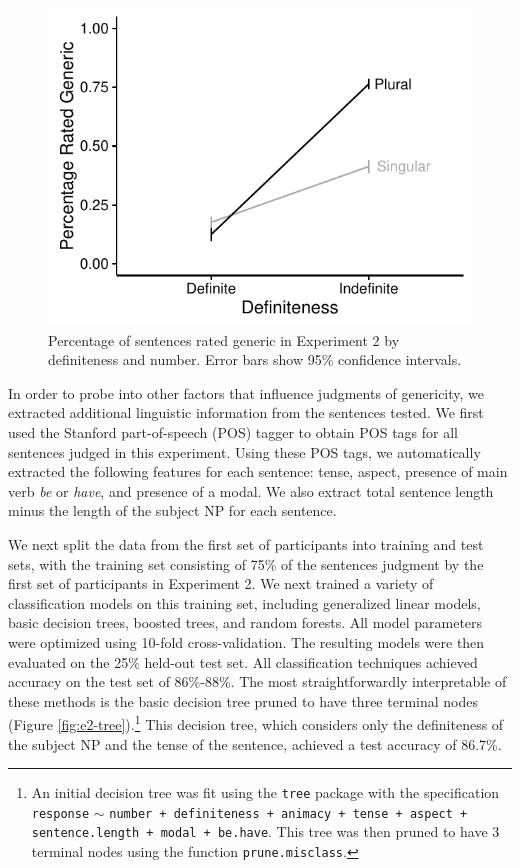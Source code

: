 \documentclass[10pt,letterpaper]{article}
\begin{document}
\begin{figure}[t]
\centering
\includegraphics[width=.8\linewidth]{figures/e2-2016.pdf}
\caption{\label{fig:e2} Percentage of sentences rated generic in Experiment 2 by definiteness and number. Error bars show 95\% confidence intervals.} 
\end{figure}

In order to probe into other factors that influence judgments of genericity, we extracted additional linguistic information from the sentences tested. We first used the Stanford part-of-speech (POS) tagger \cite{Toutanova:2003} to obtain POS tags for all sentences judged in this experiment. Using these POS tags, we automatically extracted the following features for each sentence: tense, aspect, presence of main verb \textit{be} or \textit{have}, and presence of a modal. We also extract total sentence length minus the length of the subject NP for each sentence.

We next split the data from the first set of participants into training and test sets, with the training set consisting of 75\% of the sentences judgment by the first set of participants in Experiment 2. We next trained a variety of classification models on this training set, including generalized linear models, basic decision trees, boosted trees, and random forests. All model parameters were optimized using 10-fold cross-validation. The resulting models were then evaluated on the 25\% held-out test set. All classification techniques achieved accuracy on the test set of 86\%-88\%. The most straightforwardly interpretable of these methods is the basic decision tree pruned to have three terminal nodes (Figure \ref{fig:e2-tree}).\footnote{An initial decision tree was fit using the \texttt{tree} package with the specification \texttt{response} \(\sim\) \texttt{number + definiteness + animacy + tense + aspect + sentence.length + modal + be.have}. This tree was then pruned to have 3 terminal nodes using the function \texttt{prune.misclass}.}  This decision tree, which considers only the definiteness of the subject NP and the tense of the sentence,  achieved a test accuracy of 86.7\%.
\end{document}
